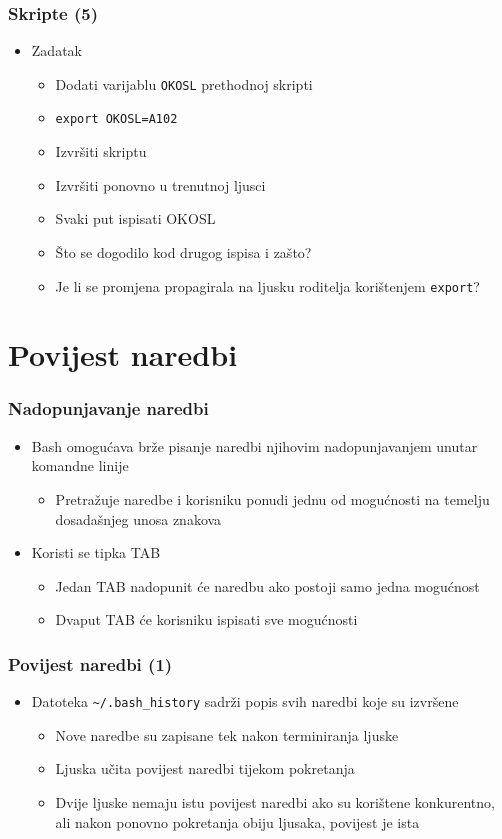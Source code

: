 \documentclass[table,usenames,dvipsnames]{beamer}
\newcommand{\shell}[1]{\texttt{#1}}
\begin{document}
\begin{frame}[t]
\frametitle{Skripte (5)}
\begin{itemize}
  \item Zadatak
  \begin{itemize}
    \item Dodati varijablu \shell{OKOSL} prethodnoj skripti
    \item[] \shell{export OKOSL=A102}
    \item Izvršiti skriptu
    \item Izvršiti ponovno u trenutnoj ljusci
    \item Svaki put ispisati OKOSL
    \item Što se dogodilo kod drugog ispisa i zašto?
    \item Je li se promjena propagirala na ljusku roditelja korištenjem 
          \shell{export}?
  \end{itemize}
\end{itemize}
\end{frame}

\section{Povijest naredbi}
\begin{frame}[t]
\frametitle{Nadopunjavanje naredbi}
\begin{itemize}
  \item Bash omogućava brže pisanje naredbi njihovim nadopunjavanjem unutar
        komandne linije
  \begin{itemize}
    \item Pretražuje naredbe i korisniku ponudi jednu od mogućnosti na 
          temelju dosadašnjeg unosa znakova
  \end{itemize}
  \item Koristi se tipka TAB
  \begin{itemize}
    \item Jedan TAB nadopunit će naredbu ako postoji samo jedna mogućnost
    \item Dvaput TAB će korisniku ispisati sve mogućnosti
  \end{itemize}
\end{itemize}
\end{frame}

\begin{frame}[t]
\frametitle{Povijest naredbi (1)}
\begin{itemize}
  \item Datoteka \shell{\~{}/.bash\_history} sadrži popis svih naredbi koje
        su izvršene
  \begin{itemize}
    \item Nove naredbe su zapisane tek nakon terminiranja ljuske
    \item Ljuska učita povijest naredbi tijekom pokretanja
    \item Dvije ljuske nemaju istu povijest naredbi ako su korištene 
          konkurentno, ali nakon ponovno pokretanja obiju ljusaka, povijest
          je ista
  \end{itemize}
\end{itemize}
\end{frame}
\end{document}
